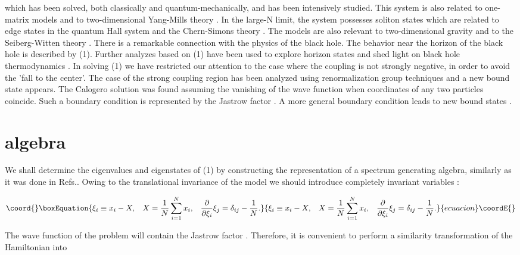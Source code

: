 \documentclass[a4paper,preprint,aps]{revtex4}
\begin{document}
which has been solved, both classically \cite{OP} and quantum-mechanically, and
has been intensively studied. This system is also related to one-matrix models
 \cite{MBIPZ,AJL} and to  two-dimensional Yang-Mills theory \cite{MP2}.
 In the large-N limit, the system possesses soliton states \cite{JPABJ} which
 are related to edge states in the quantum Hall system \cite{KAI} and the
 Chern-Simons theory \cite{ABJ}. The models are also relevant to  
 two-dimensional gravity \cite{GT} and to the Seiberg-Witten theory \cite{HP}.
 There is a remarkable connection with the physics of the black hole. The
 behavior near the horizon of the black hole is described by (1). Further
 analyzes based on (1) have been used to explore horizon states \cite{GSV,BGS}
 and shed light on black hole thermodynamics \cite{BGS}. In solving (1) we have
 restricted our attention to the case where the coupling \coordHE{}
 is not strongly negative, in order to avoid the 'fall to the center'. The
 case of the strong coupling region has been analyzed using renormalization
 group techniques \cite{GR} and a new bound state appears. The Calogero
 solution was found assuming the vanishing of the wave function when
 coordinates of any two particles coincide. Such a boundary condition is
 represented by the Jastrow factor \coordHE{}.
 A more general boundary condition leads to  new bound
 states \cite{GR,BMGG}.     


\section{\coordHE{} algebra}

We shall determine the eigenvalues and eigenstates of (1) by constructing the
 representation of a spectrum generating algebra, similarly as it was done 
in Refs.\cite{AJ,GMP}. Owing to the translational invariance of the model we
 should introduce completely invariant variables \cite{P}:


\begin{equation}\coord{}\boxEquation{
	\xi_{i} \equiv x_{i}-X,\; \; \;
	X=\frac{1}{N}\sum_{i=1}^{N}x_i,\; \; \;
	\frac{\partial}{\partial \xi_{i}}\xi_{j}=\delta_{ij}-\frac{1}{N}.  
}{
	\xi_{i} \equiv x_{i}-X,\; \; \;
	X=\frac{1}{N}\sum_{i=1}^{N}x_i,\; \; \;
	\frac{\partial}{\partial \xi_{i}}\xi_{j}=\delta_{ij}-\frac{1}{N}.  
}{ecuacion}\coordE{}\end{equation}

The wave function of the problem will contain the Jastrow factor . 
Therefore, it is convenient to perform a similarity transformation of the 
Hamiltonian into \coordHE{} 
\end{document}
